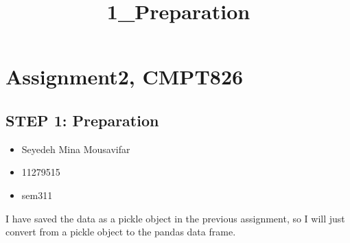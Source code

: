 \documentclass[11pt]{article}
\title{1\_Preparation}
\providecommand{\tightlist}{%
      \setlength{\itemsep}{0pt}\setlength{\parskip}{0pt}}
\begin{document}
    
    
    \maketitle
    
    

    
    \hypertarget{assignment2-cmpt826}{%
\section{Assignment2, CMPT826}\label{assignment2-cmpt826}}

\hypertarget{step-1-preparation}{%
\subsection{STEP 1: Preparation}\label{step-1-preparation}}

\begin{itemize}
\tightlist
\item
  Seyedeh Mina Mousavifar
\item
  11279515
\item
  sem311
\end{itemize}

    I have saved the data as a pickle object in the previous assignment, so
I will just convert from a pickle object to the pandas data frame.
\end{document}
